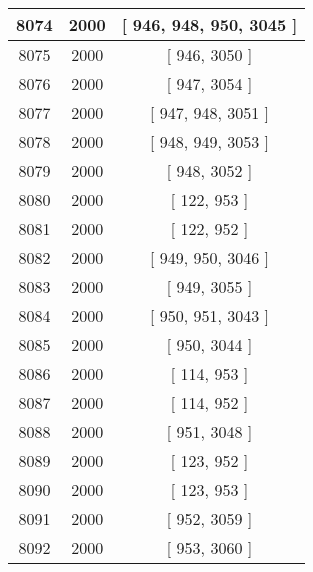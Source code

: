 \begin{center}
\begin{longtable}[H]{|| c c c ||}
\hline
8074 & 2000 & [ 946, 948, 950, 3045 ] \\ 
\hline
8075 & 2000 & [ 946, 3050 ] \\ 
\hline
8076 & 2000 & [ 947, 3054 ] \\ 
\hline
8077 & 2000 & [ 947, 948, 3051 ] \\ 
\hline
8078 & 2000 & [ 948, 949, 3053 ] \\ 
\hline
8079 & 2000 & [ 948, 3052 ] \\ 
\hline
8080 & 2000 & [ 122, 953 ] \\ 
\hline
8081 & 2000 & [ 122, 952 ] \\ 
\hline
8082 & 2000 & [ 949, 950, 3046 ] \\ 
\hline
8083 & 2000 & [ 949, 3055 ] \\ 
\hline
8084 & 2000 & [ 950, 951, 3043 ] \\ 
\hline
8085 & 2000 & [ 950, 3044 ] \\ 
\hline
8086 & 2000 & [ 114, 953 ] \\ 
\hline
8087 & 2000 & [ 114, 952 ] \\ 
\hline
8088 & 2000 & [ 951, 3048 ] \\ 
\hline
8089 & 2000 & [ 123, 952 ] \\ 
\hline
8090 & 2000 & [ 123, 953 ] \\ 
\hline
8091 & 2000 & [ 952, 3059 ] \\ 
\hline
8092 & 2000 & [ 953, 3060 ] \\ 
\hline
\end{longtable}
\end{center}
